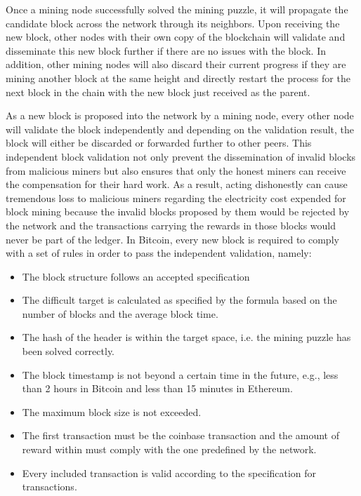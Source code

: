 Once a mining node successfully solved the mining puzzle, it will propagate the candidate block across the network through its neighbors. Upon receiving the new block, other nodes with their own copy of the blockchain will validate and disseminate this new block further if there are no issues with the block. In addition, other mining nodes will also discard their current progress if they are mining another block at the same height and directly restart the process for the next block in the chain with the new block just received as the parent.

As a new block is proposed into the network by a mining node, every other node will validate the block independently and depending on the validation result, the block will either be discarded or forwarded further to other peers. This independent block validation not only prevent the dissemination of invalid blocks from malicious miners but also ensures that only the honest miners can receive the compensation for their hard work. As a result, acting dishonestly can cause tremendous loss to malicious miners regarding the electricity cost expended for block mining because the invalid blocks proposed by them would be rejected by the network and the transactions carrying the rewards in those blocks would never be part of the ledger. 
In Bitcoin, every new block is required to comply with a set of rules in order to pass the independent validation, namely:

\begin{itemize}
	\item The block structure follows an accepted specification 
	\item The difficult target is calculated as specified by the formula based on the number of blocks and the average block time.
	\item The hash of the header is within the target space, i.e. the mining puzzle has been solved correctly.
	\item The block timestamp is not beyond a certain time in the future, e.g., less than 2 hours in Bitcoin and less than 15 minutes in Ethereum.
	\item The maximum block size is not exceeded.
	\item The first transaction must be the coinbase transaction and the amount of reward within must comply with the one predefined by the network.
	\item Every included transaction is valid according to the specification for transactions.
\end{itemize}


